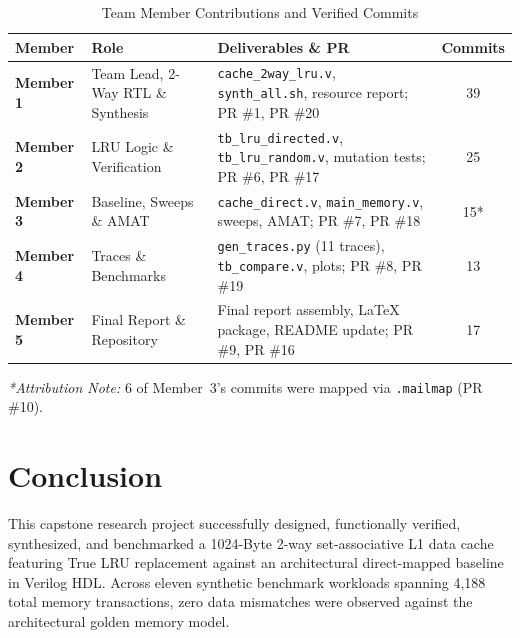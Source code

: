 \documentclass[journal,10pt,twocolumn]{IEEEtran}
\begin{document}
\begin{table}[htbp]
\centering
\caption{Team Member Contributions and Verified Commits}
\label{tab:contrib}
\begin{tabular}{p{1.1cm}p{1.9cm}p{2.6cm}c}
\toprule
\textbf{Member} & \textbf{Role} & \textbf{Deliverables \& PR} & \textbf{Commits} \\
\midrule
\textbf{Member 1} & Team Lead, 2-Way RTL \& Synthesis & \texttt{cache\_2way\_lru.v}, \texttt{synth\_all.sh}, resource report; PR \#1, PR \#20 & 39 \\
\textbf{Member 2} & LRU Logic \& Verification & \texttt{tb\_lru\_directed.v}, \texttt{tb\_lru\_random.v}, mutation tests; PR \#6, PR \#17 & 25 \\
\textbf{Member 3} & Baseline, Sweeps \& AMAT & \texttt{cache\_direct.v}, \texttt{main\_memory.v}, sweeps, AMAT; PR \#7, PR \#18 & 15* \\
\textbf{Member 4} & Traces \& Benchmarks & \texttt{gen\_traces.py} (11 traces), \texttt{tb\_compare.v}, plots; PR \#8, PR \#19 & 13 \\
\textbf{Member 5} & Final Report \& Repository & Final report assembly, LaTeX package, README update; PR \#9, PR \#16 & 17 \\
\bottomrule
\end{tabular}
\end{table}

\noindent \textit{*Attribution Note:} 6 of Member~3's commits were mapped via \texttt{.mailmap} (PR \#10).

\section{Conclusion}
This capstone research project successfully designed, functionally verified, synthesized, and benchmarked a 1024-Byte 2-way set-associative L1 data cache featuring True LRU replacement against an architectural direct-mapped baseline in Verilog HDL. Across eleven synthetic benchmark workloads spanning 4,188 total memory transactions, zero data mismatches were observed against the architectural golden memory model.
\end{document}

